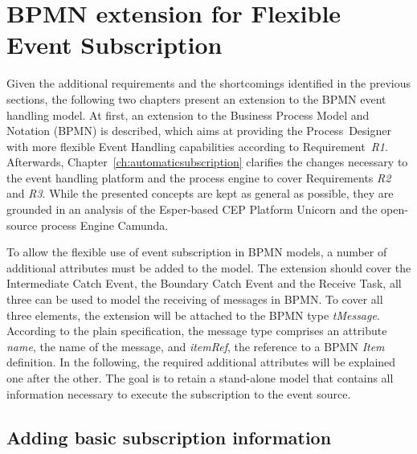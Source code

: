 \chapter{BPMN extension for Flexible Event Subscription}\label{ch:flexibleeventsubscription}


Given the additional requirements and the shortcomings identified in the previous sections, the following two chapters present an extension to the BPMN event handling model.
At first, an extension to the Business Process Model and Notation (BPMN) is described, which aims at providing the Process~Designer with more flexible Event Handling capabilities according to Requirement~\textit{R1}.
Afterwards, Chapter~\autoref{ch:automaticsubscription} clarifies the changes necessary to the event handling platform and the process engine to cover Requirements \textit{R2} and \textit{R3}.
While the presented concepts are kept as general as possible, they are grounded in an analysis of the Esper-based CEP Platform Unicorn and the open-source process Engine Camunda.

To allow the flexible use of event subscription in BPMN models, a number of additional attributes must be added to the model. 
The extension should cover the Intermediate Catch Event, the Boundary Catch Event and the Receive Task, all three can be used to model the receiving of messages in BPMN.
To cover all three elements, the extension will be attached to the BPMN type \textit{tMessage}. 
According to the plain specification, the message type comprises an attribute \textit{name}, the name of the message, and \textit{itemRef}, the reference to a BPMN \textit{Item} definition. 
In the following, the required additional attributes will be explained one after the other. The goal is to retain a stand-alone model that contains all information necessary to execute the subscription to the event source.

\section{Adding basic subscription information}

